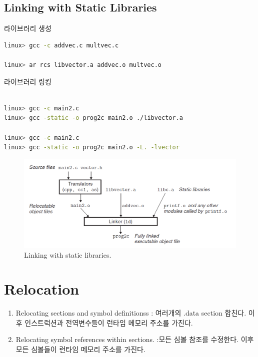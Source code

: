 \subsection{Linking with Static Libraries}

라이브러리 생성

\begin{lstlisting}[language=bash]
linux> gcc -c addvec.c multvec.c

linux> ar rcs libvector.a addvec.o multvec.o
\end{lstlisting}

라이브러리 링킹

\begin{lstlisting}[language=bash]
    
linux> gcc -c main2.c
linux> gcc -static -o prog2c main2.o ./libvector.a

linux> gcc -c main2.c
linux> gcc -static -o prog2c main2.o -L. -lvector

\end{lstlisting}

\begin{figure}[h!]
    \centering
    \includegraphics[scale=0.5]{pic/section7/pic3.png}
    \caption{Linking with static libraries.}
\end{figure}




\section{Relocation}

\begin{enumerate}
    \item Relocating sections and symbol definitionss :  여러개의 .data section 합친다. 이후 인스트럭션과 전역변수들이 런타임 메모리 주소를 가진다.
    \item Relocating symbol references within sections. :모든 심볼 참조를 수정한다. 이후  
    모든 심볼들이 런타임 메모리 주소를 가진다.
\end{enumerate}

